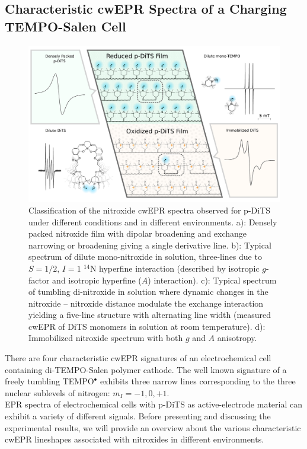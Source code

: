 \subsection{Characteristic cwEPR Spectra of a Charging TEMPO-Salen Cell}

\begin{figure}[H]
\center
	\includegraphics[width=1\textwidth]{./operando_epr/figures/Cartoon_ALL.pdf}
	\caption{Classification of the nitroxide cwEPR spectra observed for p-DiTS under different conditions and in different environments. a): Densely packed nitroxide film with dipolar broadening and exchange narrowing or broadening giving a single derivative line. b): Typical spectrum of dilute mono-nitroxide in solution, three-lines due to $S=1/2$, $I=1$ $^{14}$N hyperfine interaction (described by isotropic $g$-factor and isotropic hyperfine ($A$) interaction). c): Typical spectrum of tumbling di-nitroxide in solution where dynamic changes in the nitroxide -- nitroxide distance modulate the exchange interaction yielding a five-line structure with alternating line width (measured cwEPR of DiTS monomers in solution at room temperature). d): Immobilized nitroxide spectrum with both $g$ and $A$ anisotropy.}
	\label{fig:cartoon_spectra_dts}
\end{figure}

There are four characteristic cwEPR signatures of an electrochemical cell containing di-TEMPO-Salen polymer cathode. The well known signature of a freely tumbling TEMPO$^{\bullet}$ exhibits three narrow lines corresponding to the three nuclear sublevels of nitrogen: $m_I=-1,0,+1$.\\

EPR spectra of electrochemical cells with p-DiTS as active-electrode material can exhibit a variety of different signals. Before presenting and discussing the experimental results, we will provide an overview about the various characteristic cwEPR lineshapes associated with nitroxides in different environments.
\par

